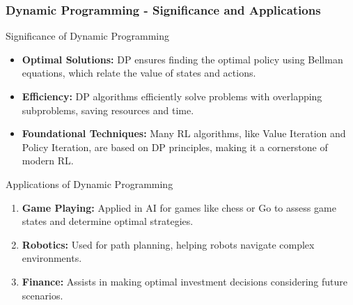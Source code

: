 \documentclass[aspectratio=169]{beamer}
\begin{document}
\begin{frame}[fragile]
    \frametitle{Dynamic Programming - Significance and Applications}
    \begin{block}{Significance of Dynamic Programming}
        \begin{itemize}
            \item \textbf{Optimal Solutions:} DP ensures finding the optimal policy using Bellman equations, which relate the value of states and actions.
            
            \item \textbf{Efficiency:} DP algorithms efficiently solve problems with overlapping subproblems, saving resources and time.
            
            \item \textbf{Foundational Techniques:} Many RL algorithms, like Value Iteration and Policy Iteration, are based on DP principles, making it a cornerstone of modern RL.
        \end{itemize}
    \end{block}
    
    \begin{block}{Applications of Dynamic Programming}
        \begin{enumerate}
            \item \textbf{Game Playing:} Applied in AI for games like chess or Go to assess game states and determine optimal strategies.
            \item \textbf{Robotics:} Used for path planning, helping robots navigate complex environments.
            \item \textbf{Finance:} Assists in making optimal investment decisions considering future scenarios.
        \end{enumerate}
    \end{block}
\end{frame}
\end{document}
